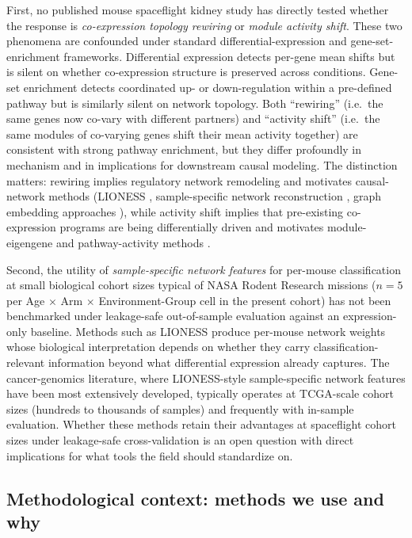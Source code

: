 \documentclass[11pt]{article}
\begin{document}
First, no published mouse spaceflight kidney study has directly tested whether the response is \emph{co-expression topology rewiring} or \emph{module activity shift}. These two phenomena are confounded under standard differential-expression and gene-set-enrichment frameworks. Differential expression detects per-gene mean shifts but is silent on whether co-expression structure is preserved across conditions. Gene-set enrichment detects coordinated up- or down-regulation within a pre-defined pathway but is similarly silent on network topology. Both ``rewiring'' (i.e.\ the same genes now co-vary with different partners) and ``activity shift'' (i.e.\ the same modules of co-varying genes shift their mean activity together) are consistent with strong pathway enrichment, but they differ profoundly in mechanism and in implications for downstream causal modeling. The distinction matters: rewiring implies regulatory network remodeling and motivates causal-network methods (LIONESS \citep{kuijjer2019estimating}, sample-specific network reconstruction \citep{liu2016single, dai2019cell}, graph embedding approaches \citep{grover2016node2vec, liu2021pecanpy}), while activity shift implies that pre-existing co-expression programs are being differentially driven and motivates module-eigengene and pathway-activity methods \citep{langfelder2008wgcna}.

Second, the utility of \emph{sample-specific network features} for per-mouse classification at small biological cohort sizes typical of NASA Rodent Research missions ($n{=}5$ per Age $\times$ Arm $\times$ Environment-Group cell in the present cohort) has not been benchmarked under leakage-safe out-of-sample evaluation against an expression-only baseline. Methods such as LIONESS produce per-mouse network weights whose biological interpretation depends on whether they carry classification-relevant information beyond what differential expression already captures. The cancer-genomics literature, where LIONESS-style sample-specific network features have been most extensively developed, typically operates at TCGA-scale cohort sizes (hundreds to thousands of samples) and frequently with in-sample evaluation. Whether these methods retain their advantages at spaceflight cohort sizes under leakage-safe cross-validation is an open question with direct implications for what tools the field should standardize on.

\subsection{Methodological context: methods we use and why}
\end{document}
